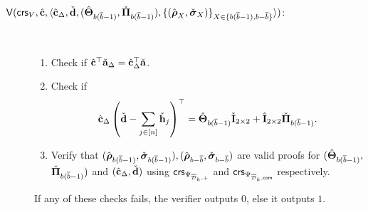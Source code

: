 \begin{description}
\item[$\mathsf{V}(
    \mathsf{crs}_V,
    {\hat{\mathbf{c}}},
    \langle
        {\hat{\mathbf{c}}}_{\Delta}, \check{\mathbf{d}},
        ({\hat{\mathbf{{\Theta}}}}_{b(\overline{b}-1)}, \check{\mathbf{{\Pi}}}_{b(\overline{b}-1)}), 
        \{(\hat{\boldsymbol \rho}_{X}, \check{\boldsymbol \sigma}_{X})\}_{X \in \{b(\overline{b}-1), b-\overline{b}\}} \rangle)$:] ~
%   
\begin{enumerate}
\item  Check if ${\hat{\mathbf{c}}}^\top\check{\mathbf{a}}_\Delta = {\hat{\mathbf{c}}}_\Delta^\top\check{\mathbf{a}}$. 
\item Check if 
\begin{equation}\label{eq:ver1}{\hat{\mathbf{c}}}_{\Delta}
\left(
    \check{\mathbf{d}}-
    \sum_{j \in [n]} \check{\mathbf{h}}_{j}
\right)^{\top} =
    {\hat{\mathbf{{\Theta}}}}_{b(\overline{b}-1)} \check{\mathbf{{I}}}_{2 \times 2} +
    {\hat{\mathbf{{I}}}}_{2 \times 2}\check{\mathbf{{\Pi}}}_{b(\overline{b}-1)}.
    \end{equation}  
  \item Verify that $(\hat{{\boldsymbol \rho}}_{b(\overline{b}-1)}, \check{{\boldsymbol \sigma}}_{b(\overline{b}-1)}),(\hat{{\boldsymbol \rho}}_{b-\overline{b}},\check{{\boldsymbol \sigma}}_{b-\overline{b}})$ are valid proofs for %
  $({\hat{\mathbf{{\Theta}}}}_{b(\overline{b}-1)},$ $\check{\mathbf{{\Pi}}}_{b(\overline{b}-1)})$
        and $({\hat{\mathbf{c}}}_\Delta,\check{\mathbf{d}})$ using $\mathsf{crs}_{\Psi_{\overline{\mathcal{D}}_k,+}}$ and $\mathsf{crs}_{\Psi_{\overline{\mathcal{D}}_k,\mathsf{com}}}$ respectively.
\end{enumerate}
If any of these checks fails, the verifier outputs $0$, else it outputs $1$.

\end{description}

